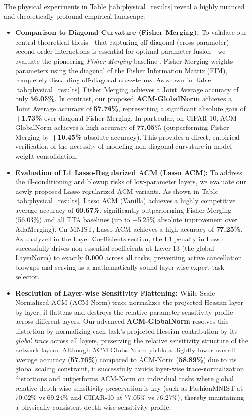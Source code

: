 The physical experiments in Table \ref{tab:physical_results} reveal a highly nuanced and theoretically profound empirical landscape:
\begin{itemize}
    \item \textbf{Comparison to Diagonal Curvature (Fisher Merging):} To validate our central theoretical thesis—that capturing off-diagonal (cross-parameter) second-order interactions is essential for optimal parameter fusion—we evaluate the pioneering \emph{Fisher Merging} baseline \cite{matena2022merging}. Fisher Merging weights parameters using the diagonal of the Fisher Information Matrix (FIM), completely discarding off-diagonal cross-terms. As shown in Table \ref{tab:physical_results}, Fisher Merging achieves a Joint Average accuracy of only \textbf{56.03\%}. In contrast, our proposed \textbf{ACM-GlobalNorm} achieves a Joint Average accuracy of \textbf{57.76\%}, representing a significant absolute gain of \textbf{+1.73\%} over diagonal Fisher Merging. In particular, on CIFAR-10, ACM-GlobalNorm achieves a high accuracy of \textbf{77.05\%} (outperforming Fisher Merging by \textbf{+10.45\%} absolute accuracy). This provides a direct, empirical verification of the necessity of modeling non-diagonal curvature in model weight consolidation.
    \item \textbf{Evaluation of L1 Lasso-Regularized ACM (Lasso ACM):} To address the ill-conditioning and blowup risks of low-parameter layers, we evaluate our newly proposed Lasso regularized ACM variants. As shown in Table \ref{tab:physical_results}, Lasso ACM (Vanilla) achieves a highly competitive average accuracy of \textbf{60.67\%}, significantly outperforming Fisher Merging (56.03\%) and all TTA baselines (up to +5.25\% absolute improvement over AdaMerging). On MNIST, Lasso ACM achieves a high accuracy of \textbf{77.25\%}. As analyzed in the Layer Coefficients section, the L1 penalty in Lasso successfully drives non-essential coefficients at Layer 13 (the global LayerNorm) to exactly \textbf{0.000} across all tasks, preventing active cancellation blowups and serving as a mathematically sound layer-wise expert task selector.
    \item \textbf{Resolution of Layer-wise Sensitivity Flattening:} While Scale-Normalized ACM (ACM-Norm) trace-normalizes the projected Hessian layer-by-layer, it flattens and destroys the relative parameter sensitivity profile across different layers. Our advanced \textbf{ACM-GlobalNorm} resolves this distortion by normalizing each task's projected Hessian contribution by its \emph{global trace} across all layers, preserving the relative sensitivity structure of the network layers. Although ACM-GlobalNorm yields a slightly lower overall average accuracy (\textbf{57.76\%}) compared to ACM-Norm (\textbf{58.89\%}) due to its global scaling constraint, it successfully avoids layer-wise trace-normalization distortions and outperforms ACM-Norm on individual tasks where global relative depth-wise sensitivity preservation is key (such as FashionMNIST at 70.02\% vs 69.24\% and CIFAR-10 at 77.05\% vs 76.27\%), thereby maintaining a physically consistent depth-wise sensitivity profile.

\end{itemize}
